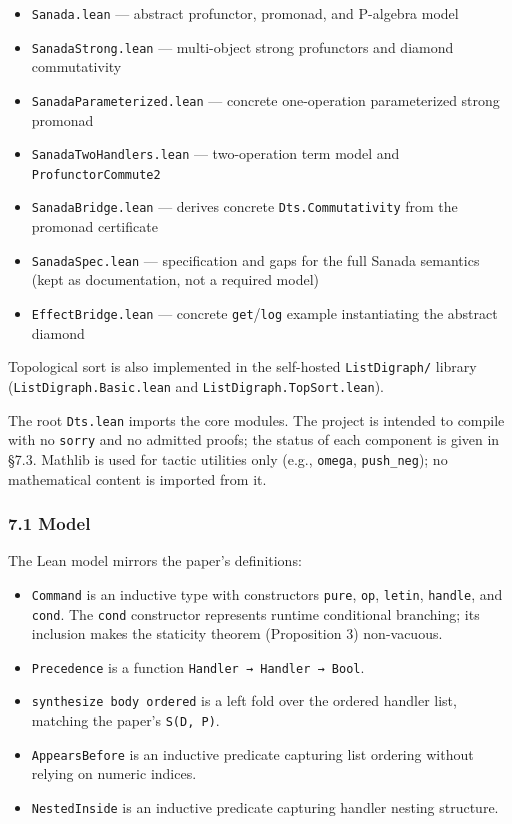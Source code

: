 \documentclass[
  11pt,
]{article}
\providecommand{\tightlist}{%
  \setlength{\itemsep}{0pt}\setlength{\parskip}{0pt}}
\begin{document}
\begin{itemize}
\tightlist
\item
  \texttt{Sanada.lean} --- abstract profunctor, promonad, and P-algebra
  model
\item
  \texttt{SanadaStrong.lean} --- multi-object strong profunctors and
  diamond commutativity
\item
  \texttt{SanadaParameterized.lean} --- concrete one-operation
  parameterized strong promonad
\item
  \texttt{SanadaTwoHandlers.lean} --- two-operation term model and
  \texttt{ProfunctorCommute2}
\item
  \texttt{SanadaBridge.lean} --- derives concrete
  \texttt{Dts.Commutativity} from the promonad certificate
\item
  \texttt{SanadaSpec.lean} --- specification and gaps for the full
  Sanada semantics (kept as documentation, not a required model)
\item
  \texttt{EffectBridge.lean} --- concrete \texttt{get}/\texttt{log}
  example instantiating the abstract diamond
\end{itemize}

Topological sort is also implemented in the self-hosted
\texttt{ListDigraph/} library (\texttt{ListDigraph.Basic.lean} and
\texttt{ListDigraph.TopSort.lean}).

The root \texttt{Dts.lean} imports the core modules. The project is
intended to compile with no \texttt{sorry} and no admitted proofs; the
status of each component is given in §7.3. Mathlib is used for tactic
utilities only (e.g., \texttt{omega}, \texttt{push\_neg}); no
mathematical content is imported from it.

\subsubsection{7.1 Model}\label{model}

The Lean model mirrors the paper's definitions:

\begin{itemize}
\tightlist
\item
  \texttt{Command} is an inductive type with constructors \texttt{pure},
  \texttt{op}, \texttt{letin}, \texttt{handle}, and \texttt{cond}. The
  \texttt{cond} constructor represents runtime conditional branching;
  its inclusion makes the staticity theorem (Proposition 3) non-vacuous.
\item
  \texttt{Precedence} is a function
  \texttt{Handler\ →\ Handler\ →\ Bool}.
\item
  \texttt{synthesize\ body\ ordered} is a left fold over the ordered
  handler list, matching the paper's \texttt{S(D,\ P)}.
\item
  \texttt{AppearsBefore} is an inductive predicate capturing list
  ordering without relying on numeric indices.
\item
  \texttt{NestedInside} is an inductive predicate capturing handler
  nesting structure.
\end{itemize}
\end{document}
